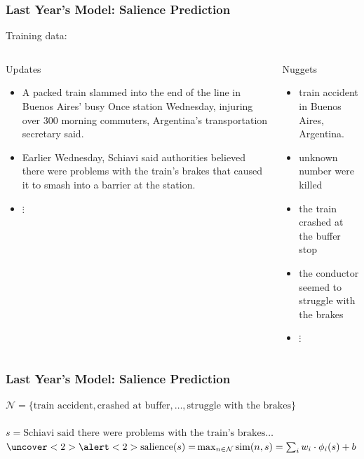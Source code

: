 \documentclass{beamer}
\begin{document}
\begin{frame}
\frametitle{Last Year's Model: Salience Prediction}


Training data:

\begin{columns}[T] %
\begin{column}{.48\textwidth}
Updates
\begin{itemize}
\item A packed train slammed into the end of the line in Buenos Aires' busy 
    Once station Wednesday, injuring over 300 morning commuters, 
    Argentina's transportation secretary said.
\item Earlier Wednesday, Schiavi said authorities believed there were problems with the train's brakes that caused it to smash into a barrier at the station.
\item[] \center $\vdots$
\end{itemize}
\end{column}%
\hfill%
\begin{column}{.48\textwidth}
Nuggets
\begin{itemize}
\item train accident in Buenos Aires, Argentina.
\item unknown number were killed
\item the train crashed at the buffer stop
\item the conductor seemed to struggle with the brakes
\item[] \center $\vdots$
\end{itemize}
\end{column}%
\end{columns}

\end{frame}

\begin{frame}
\frametitle{Last Year's Model: Salience Prediction}
    $\mathcal{N} = \{\textrm{train accident}, 
        \textrm{crashed at buffer}, \ldots, 
    \textrm{struggle with the brakes} \}$\\
    ~\\
    $s = \textrm{Schiavi said there were problems with the train's brakes} \ldots$\\
    \center
    $ \uncover<2>{\alert<2>{\operatorname{salience}(s)} =} \operatorname{max}_{n \in \mathcal{N}} \operatorname{sim}(n,s) = 
        \sum_i w_{i} \cdot \phi_{i}(s)  + b$ \\

\end{frame}
\end{document}
